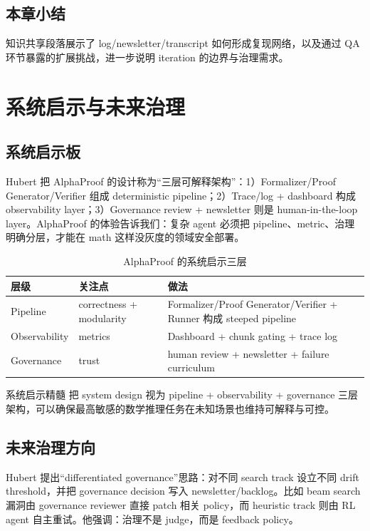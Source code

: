 \documentclass[a4paper]{article}
\begin{document}
\subsection{本章小结}
知识共享段落展示了 log/newsletter/transcript 如何形成复现网络，以及通过 QA 环节暴露的扩展挑战，进一步说明 iteration 的边界与治理需求。
\newpage

\section{系统启示与未来治理}

\subsection{系统启示板}
Hubert 把 AlphaProof 的设计称为“三层可解释架构”：1）Formalizer/Proof Generator/Verifier 组成 deterministic pipeline；2）Trace/log + dashboard 构成 observability layer；3）Governance review + newsletter 则是 human-in-the-loop layer。AlphaProof 的体验告诉我们：复杂 agent 必须把 pipeline、metric、治理明确分层，才能在 math 这样没灰度的领域安全部署。

\begin{table}[H]
\centering
\begin{tabular}{p{3cm}p{4cm}p{5cm}}
\toprule
层级 & 关注点 & 做法 \\
\midrule
Pipeline & correctness + modularity & Formalizer/Proof Generator/Verifier + Runner 构成 steeped pipeline \\
Observability & metrics & Dashboard + chunk gating + trace log \\
Governance & trust & human review + newsletter + failure curriculum \\
\bottomrule
\end{tabular}
\caption{AlphaProof 的系统启示三层}
\end{table}

\begin{knowledgebox}{系统启示精髓}
把 system design 视为 pipeline + observability + governance 三层架构，可以确保最高敏感的数学推理任务在未知场景也维持可解释与可控。
\end{knowledgebox}

\subsection{未来治理方向}
Hubert 提出“differentiated governance”思路：对不同 search track 设立不同 drift threshold，并把 governance decision 写入 newsletter/backlog。比如 beam search 漏洞由 governance reviewer 直接 patch 相关 policy，而 heuristic track 则由 RL agent 自主重试。他强调：治理不是 judge，而是 feedback policy。
\end{document}
